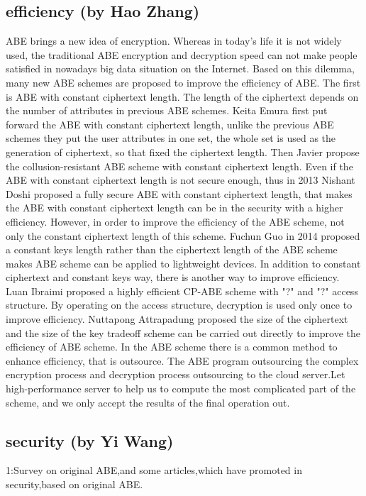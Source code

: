 \subsection{efficiency (by Hao Zhang)}
ABE brings a new idea of encryption. Whereas in today's life it is not widely used, the traditional ABE encryption and decryption speed can not make people satisfied in nowadays big data situation on the Internet. Based on this dilemma, many new ABE schemes are proposed to improve the efficiency of ABE. The first is ABE with constant ciphertext length. The length of the ciphertext depends on the number of attributes in previous ABE schemes. Keita Emura \cite{Keita:ISPEC'09} first put forward the ABE with constant ciphertext length, unlike the previous ABE schemes they put the user attributes in one set, the whole set is used as the generation of ciphertext, so that fixed the ciphertext length. Then Javier \cite{Javier:PKC'10} propose the collusion-resistant ABE scheme with constant ciphertext length. Even if the ABE with constant ciphertext length is not secure enough, thus in 2013 Nishant Doshi \cite{Nishant:Wiley'14} proposed a fully secure ABE with constant ciphertext length, that makes the ABE with constant ciphertext length can be in the security with a higher efficiency.
	However, in order to improve the efficiency of the ABE scheme, not only the constant ciphertext length of this scheme. Fuchun Guo \cite{Fuchun:TIFS'14} in 2014 proposed a constant keys length rather than the ciphertext length of the ABE scheme makes ABE scheme can be applied to lightweight devices. In addition to constant ciphertext and constant keys way, there is another way to improve efficiency. Luan Ibraimi \cite{Luan:ISPEC'09} proposed a highly efficient CP-ABE scheme with "?" and "?" access structure. By operating on the access structure, decryption is used only once to improve efficiency. Nuttapong Attrapadung \cite{Tadanori:ACNS'16} proposed the size of the ciphertext and the size of the key tradeoff scheme can be carried out directly to improve the efficiency of ABE scheme.
	In the ABE scheme there is a common method to enhance efficiency, that is outsource. The ABE program outsourcing the complex encryption process and decryption process outsourcing to the cloud server.Let high-performance server to help us to compute the most complicated part of the scheme, and we only accept the results of the final operation out.

\subsection{security (by Yi Wang)}
1:Survey on original ABE,and some articles,which have promoted in security,based on original ABE.

